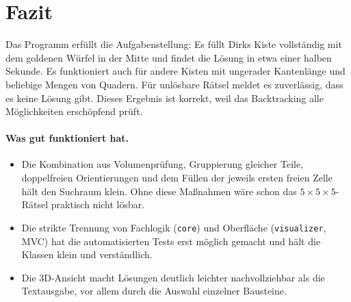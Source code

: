 \documentclass[11pt,a4paper,parskip=half]{scrartcl}
\newcommand{\code}[1]{\texttt{#1}}
\begin{document}
\section{Fazit}

Das Programm erfüllt die Aufgabenstellung: Es füllt Dirks Kiste vollständig mit dem
goldenen Würfel in der Mitte und findet die Lösung in etwa einer halben Sekunde. Es
funktioniert auch für andere Kisten mit ungerader Kantenlänge und beliebige Mengen von
Quadern. Für unlösbare Rätsel meldet es zuverlässig, dass es keine Lösung gibt.
Dieses Ergebnis ist korrekt, weil das Backtracking alle Möglichkeiten erschöpfend
prüft.

\paragraph{Was gut funktioniert hat.}
\begin{itemize}
  \item Die Kombination aus Volumenprüfung, Gruppierung gleicher Teile,
        doppelfreien Orientierungen und dem Füllen der jeweils ersten freien Zelle
        hält den Suchraum klein. Ohne diese Maßnahmen wäre schon das
        $5\times5\times5$-Rätsel praktisch nicht lösbar.
  \item Die strikte Trennung von Fachlogik (\code{core}) und Oberfläche
        (\code{visualizer}, MVC) hat die automatisierten Tests erst möglich gemacht
        und hält die Klassen klein und verständlich.
  \item Die 3D-Ansicht macht Lösungen deutlich leichter nachvollziehbar als die
        Textausgabe, vor allem durch die Auswahl einzelner Bausteine.
\end{itemize}
\end{document}
